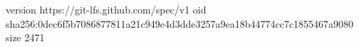 version https://git-lfs.github.com/spec/v1
oid sha256:0dec6f5b7086877811a21c949e4d3dde3257a9ea18b44774cc7c1855467a9080
size 2471
